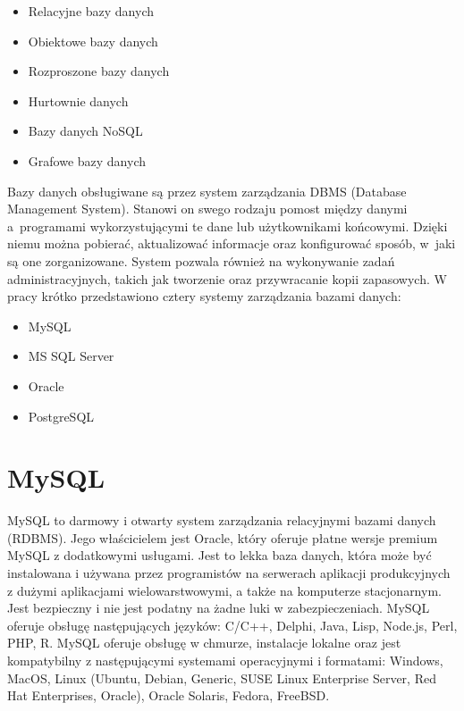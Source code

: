 \documentclass[oneside,polski,logo,indent]{amuthesis}
\begin{document}
\begin{itemize}
\item Relacyjne bazy danych
\item Obiektowe bazy danych
\item Rozproszone bazy danych
\item Hurtownie danych
\item Bazy danych NoSQL
\item Grafowe bazy danych
\end{itemize}

Bazy danych obsługiwane są przez system zarządzania DBMS (Database Management System). Stanowi on swego rodzaju pomost między danymi a~programami wykorzystującymi te dane lub użytkownikami końcowymi. Dzięki niemu można pobierać, aktualizować informacje oraz konfigurować sposób, w~jaki są one zorganizowane. System pozwala również na wykonywanie zadań administracyjnych, takich jak tworzenie oraz przywracanie kopii zapasowych.
W pracy krótko przedstawiono cztery systemy zarządzania bazami danych: 

\begin{itemize}
\item MySQL 
\item MS SQL Server 
\item Oracle 
\item PostgreSQL 
\end{itemize}
\section{MySQL}
MySQL to darmowy i otwarty system zarządzania relacyjnymi bazami danych (RDBMS). Jego właścicielem jest Oracle, który oferuje płatne wersje premium MySQL z dodatkowymi usługami. Jest to lekka baza danych, która może być instalowana i używana przez programistów na serwerach aplikacji produkcyjnych z dużymi aplikacjami wielowarstwowymi, a także na komputerze stacjonarnym. Jest bezpieczny i nie jest podatny na żadne luki w zabezpieczeniach. MySQL oferuje obsługę następujących języków: C/C++, Delphi, Java, Lisp, Node.js, Perl, PHP, R.
MySQL oferuje obsługę w chmurze, instalacje lokalne oraz jest kompatybilny z następującymi systemami operacyjnymi i formatami: Windows, MacOS, Linux (Ubuntu, Debian, Generic, SUSE Linux Enterprise Server, Red Hat Enterprises, Oracle), Oracle Solaris, Fedora, FreeBSD.
\end{document}
